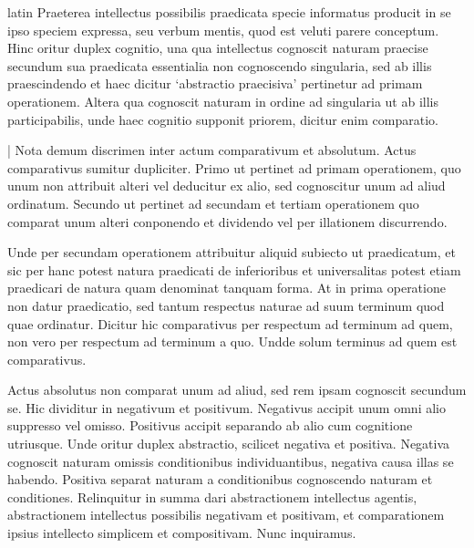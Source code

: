 \begin{otherlanguage*}{latin}
\pstart
Praeterea intellectus possibilis praedicata specie informatus producit in se ipso speciem expressa, seu verbum mentis, quod est veluti parere conceptum. Hinc oritur duplex cognitio, una qua intellectus cognoscit naturam praecise secundum sua praedicata essentialia non cognoscendo singularia, sed ab illis praescindendo et haec dicitur `abstractio praecisiva' pertinetur ad primam operationem. Altera qua cognoscit naturam in ordine ad singularia ut ab illis participabilis, unde haec cognitio supponit priorem, dicitur enim comparatio. 
\pend

\pstart
\textnormal{|} Nota demum discrimen inter actum comparativum et absolutum. Actus comparativus sumitur dupliciter. Primo ut pertinet ad primam operationem, quo unum non attribuit alteri vel deducitur ex alio, sed cognoscitur unum ad aliud ordinatum. Secundo ut pertinet ad secundam et tertiam operationem quo comparat unum alteri conponendo et dividendo vel per illationem discurrendo. 
\pend

\pstart
Unde per secundam operationem attribuitur aliquid subiecto ut praedicatum, et sic per hanc potest natura praedicati de inferioribus et universalitas potest etiam praedicari de natura quam denominat tanquam forma. At in prima operatione non datur praedicatio, sed tantum respectus naturae ad suum terminum quod quae ordinatur. Dicitur hic comparativus per respectum ad terminum ad quem, non vero per respectum ad terminum a quo. Undde solum terminus ad quem est comparativus. 
\pend

\pstart
Actus absolutus non comparat unum ad aliud, sed rem ipsam cognoscit secundum se. Hic dividitur in negativum et positivum. Negativus accipit unum omni alio suppresso vel omisso. Positivus accipit separando ab alio cum cognitione utriusque. Unde oritur duplex abstractio, scilicet negativa et positiva. Negativa cognoscit naturam omissis conditionibus individuantibus, negativa causa illas se habendo. Positiva separat naturam a conditionibus cognoscendo naturam et conditiones. Relinquitur in summa dari abstractionem intellectus agentis, abstractionem intellectus possibilis negativam et positivam, et comparationem ipsius intellecto simplicem et compositivam. Nunc inquiramus. 
\pend

\pstart
{}
\pend


\end{otherlanguage*}
